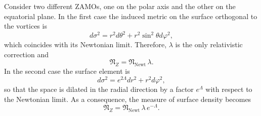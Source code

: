 \documentclass[usenatbib%
]{mnras}
\begin{document}
Consider two different ZAMOs, one on the polar axis and the other on the equatorial plane. In the first case the induced metric on the surface orthogonal to the vortices is  
\begin{equation}
d\sigma^2 = r^2 d\theta^2 + r^2 \sin^2 \theta d\varphi^2,
\end{equation}
which coincides with its Newtonian limit. Therefore, $\lambda$ is the only relativistic correction and
\begin{equation}
\mathfrak{N}_Z = \mathfrak{N}_{\textrm{Newt}} \, \lambda.
\end{equation}
In the second case the surface element is
\begin{equation}
d\sigma^2 = e^{2\Lambda} dr^2 + r^2 d\varphi^2,
\end{equation}
so that the space is dilated in the radial direction by a factor $e^\Lambda$ with respect to the Newtonian limit. As a consequence, the measure of surface density becomes
\begin{equation}\label{mistermuscoloidraulicogel}
\mathfrak{N}_Z= \mathfrak{N}_{\textrm{Newt}} \, \lambda \, e^{-\Lambda}.
\end{equation}
\end{document}

